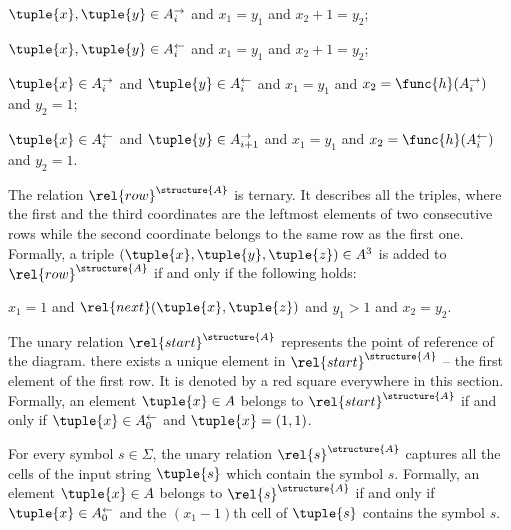 \documentclass{lmcs}
\begin{document}
\begin{compactitem}
\begin{compactitem}
\item $\tuple{x},\tuple{y}\in A_i^\rightarrow$ and $x_1=y_1$ and $x_2+1=y_2$;
\item $\tuple{x},\tuple{y}\in A_i^\leftarrow$ and $x_1=y_1$ and $x_2+1=y_2$;
\item $\tuple{x}\in A_i^\rightarrow$ and $\tuple{y}\in A_i^\leftarrow$ and $x_1=y_1$ and $x_2 = \func{h}(A_i^\rightarrow)$ and $y_2=1$;
\item $\tuple{x}\in A_i^\leftarrow$ and $\tuple{y}\in A_{i+1}^\rightarrow$ and $x_1=y_1$ and $x_2 = \func{h}(A_i^\leftarrow)$ and $y_2=1$.
\end{compactitem}
\item The relation $\rel{row}^\structure{A}$ is ternary. It describes all the triples, where the first and the third coordinates are the leftmost elements of two consecutive rows while the second coordinate belongs to the same row as the first one.
Formally, a triple $(\tuple{x},\tuple{y},\tuple{z})\in A^3$ is added to $\rel{row}^\structure{A}$ if and only if the following holds:
\begin{center}
$x_1=1$ \: and \: $\rel{next}(\tuple{x},\tuple{z})$ \: and \: $y_1>1$ \: and \: $x_2=y_2$.
\end{center}

\item The unary relation $\rel{start}^\structure{A}$ represents the point of reference of the diagram. 
there exists a unique element in $\rel{start}^\structure{A}$ -- the first element of the first row. It is denoted by a red square everywhere in this section. 
Formally, an element $\tuple{x}\in A$ belongs to $\rel{start}^\structure{A}$ if and only if $\tuple{x}\in A_0^\leftarrow$ and $\tuple{x} = (1,1)$.
\item For every symbol $s\in\Sigma$, the unary relation $\rel{s}^\structure{A}$ captures all the cells of the input string $\tuple{s}$ which contain the symbol $s$.
Formally, an element $\tuple{x}\in A$ belongs to $\rel{s}^\structure{A}$ if and only if $\tuple{x}\in A_0^\leftarrow$ and the $(x_1-1)$th cell of $\tuple{s}$ contains the symbol $s$.
\end{compactitem}
\end{document}
